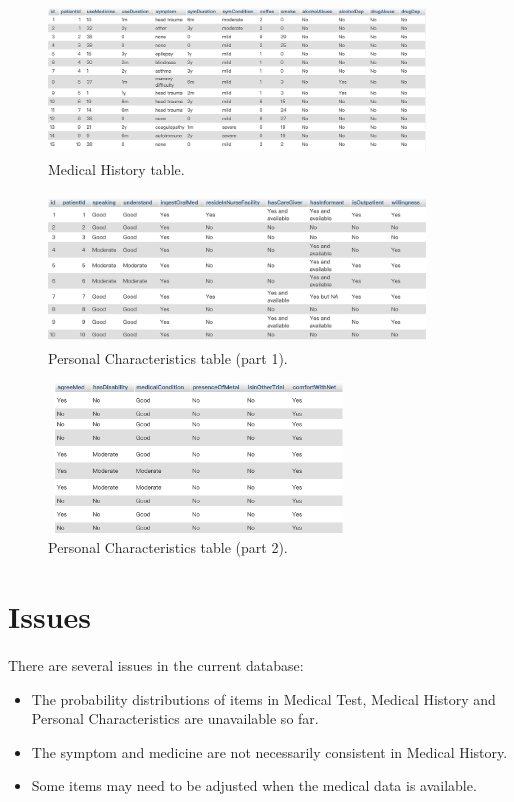 \documentclass{article}
\begin{document}
\begin{figure}[!hbt]
\centering
\includegraphics[width=10cm, height=4cm]{figs/res_medhist.png}
\caption{Medical History table.}
\label{f:res_medhist}
\end{figure}

\begin{figure}[!hbt]
\centering
\includegraphics[width=10cm, height=4cm]{figs/res_personal1.png}
\caption{Personal Characteristics table (part 1).}
\label{f:res_personal1}
\end{figure}

\begin{figure}[!hbt]
\centering
\includegraphics[width=8cm, height=4cm]{figs/res_personal2.png}
\caption{Personal Characteristics table (part 2).}
\label{f:res_personal2}
\end{figure}

\newpage
\section{Issues}
\paragraph{}
There are several issues in the current database:

\begin{itemize}
  \item The probability distributions of items in Medical Test, Medical History and Personal Characteristics are unavailable so far.
  \item The symptom and medicine are not necessarily consistent in Medical History.
  \item Some items may need to be adjusted when the medical data is available.
\end{itemize}
\end{document}
